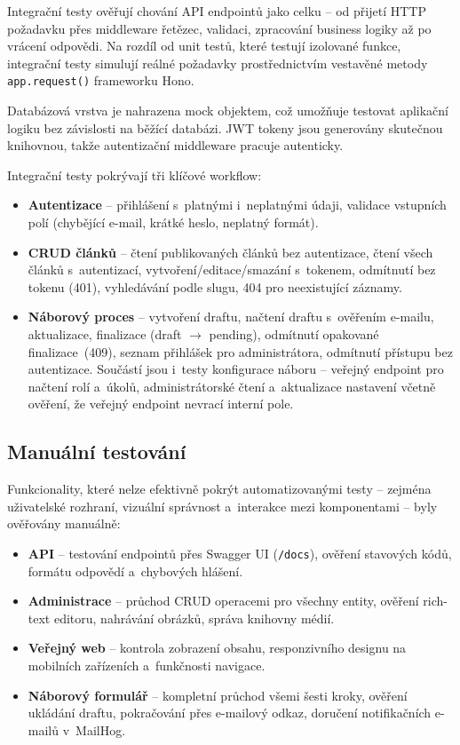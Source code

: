 Integrační testy ověřují chování API endpointů jako celku -- od přijetí HTTP požadavku přes middleware řetězec, validaci, zpracování business logiky až po vrácení odpovědi. Na rozdíl od unit testů, které testují izolované funkce, integrační testy simulují reálné požadavky prostřednictvím vestavěné metody \texttt{app.request()} frameworku Hono.

Databázová vrstva je nahrazena mock objektem, což umožňuje testovat aplikační logiku bez závislosti na běžící databázi. JWT tokeny jsou generovány skutečnou knihovnou, takže autentizační middleware pracuje autenticky.

Integrační testy pokrývají tři klíčové workflow:

\begin{itemize}
    \item \textbf{Autentizace} -- přihlášení s~platnými i~neplatnými údaji, validace vstupních polí (chybějící e-mail, krátké heslo, neplatný formát).
    \item \textbf{CRUD článků} -- čtení publikovaných článků bez autentizace, čtení všech článků s~autentizací, vytvoření/editace/smazání s~tokenem, odmítnutí bez tokenu (401), vyhledávání podle slugu, 404 pro neexistující záznamy.
    \item \textbf{Náborový proces} -- vytvoření draftu, načtení draftu s~ověřením e-mailu, aktualizace, finalizace (draft $\rightarrow$ pending), odmítnutí opakované finalizace~(409), seznam přihlášek pro administrátora, odmítnutí přístupu bez autentizace. Součástí jsou i~testy konfigurace náboru -- veřejný endpoint pro načtení rolí a~úkolů, administrátorské čtení a~aktualizace nastavení včetně ověření, že veřejný endpoint nevrací interní pole.
\end{itemize}

\subsection{Manuální testování}

Funkcionality, které nelze efektivně pokrýt automatizovanými testy -- zejména uživatelské rozhraní, vizuální správnost a~interakce mezi komponentami -- byly ověřovány manuálně:

\begin{itemize}
    \item \textbf{API} -- testování endpointů přes Swagger UI (\texttt{/docs}), ověření stavových kódů, formátu odpovědí a~chybových hlášení.
    \item \textbf{Administrace} -- průchod CRUD operacemi pro všechny entity, ověření rich-text editoru, nahrávání obrázků, správa knihovny médií.
    \item \textbf{Veřejný web} -- kontrola zobrazení obsahu, responzivního designu na mobilních zařízeních a~funkčnosti navigace.
    \item \textbf{Náborový formulář} -- kompletní průchod všemi šesti kroky, ověření ukládání draftu, pokračování přes e-mailový odkaz, doručení notifikačních e-mailů v~Mail\-Hog.
\end{itemize}

